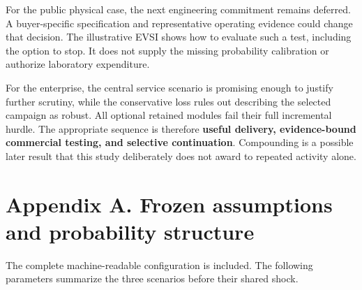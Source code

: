 \documentclass[
  11pt,
  letterpaper,
]{article}
\begin{document}
For the public physical case, the next engineering commitment remains
deferred. A buyer-specific specification and representative operating
evidence could change that decision. The illustrative EVSI shows how to
evaluate such a test, including the option to stop. It does not supply
the missing probability calibration or authorize laboratory expenditure.

For the enterprise, the central service scenario is promising enough to
justify further scrutiny, while the conservative loss rules out
describing the selected campaign as robust. All optional retained
modules fail their full incremental hurdle. The appropriate sequence is
therefore \textbf{useful delivery, evidence-bound commercial testing,
and selective continuation}. Compounding is a possible later result that
this study deliberately does not award to repeated activity alone.

\newpage

\hypertarget{appendix-a.-frozen-assumptions-and-probability-structure}{%
\section{Appendix A. Frozen assumptions and probability
structure}\label{appendix-a.-frozen-assumptions-and-probability-structure}}

The complete machine-readable configuration is included. The following
parameters summarize the three scenarios before their shared shock.
\end{document}
